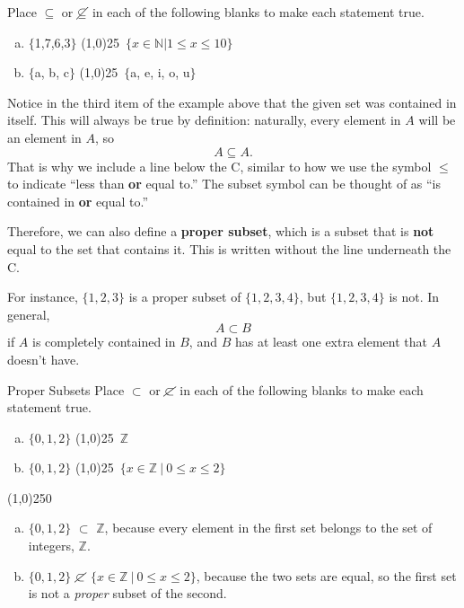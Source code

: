 \begin{try}
Place $\subseteq$ or $\cancel{\subseteq}$ in each of the following blanks to make each statement true.\\

\begin{enumerate}[(a)]
\item $\{$1,7,6,3$\}$ \line(1,0){25}\ $\{x \in \mathbb{N} | 1 \leq x \leq 10\}$\\

\item $\{$a, b, c$\}$ \line(1,0){25}\ $\{$a, e, i, o, u$\}$
\end{enumerate}
\end{try}

Notice in the third item of the example above that the given set was contained in itself.  This will always be true by definition: naturally, every element in $A$ will be an element in $A$, so \[A \subseteq A.\]  That is why we include a line below the C, similar to how we use the symbol $\leq$ to indicate ``less than \textbf{or} equal to.''  The subset symbol can be thought of as ``is contained in \textbf{or} equal to.''

Therefore, we can also define a \textbf{proper subset}, which is a subset that is \textbf{not} equal to the set that contains it.  This is written without the line underneath the C.

For instance, $\{1,2,3\}$ is a proper subset of $\{1,2,3,4\}$, but $\{1,2,3,4\}$ is not.  In general,
\[A \subset B\] if $A$ is completely contained in $B$, and $B$ has at least one extra element that $A$ doesn't have.

\begin{example}[https://www.youtube.com/watch?v=c06crpTh6-8]{Proper Subsets}
Place $\subset$ or $\cancel{\subset}$ in each of the following blanks to make each statement true.\\

\begin{enumerate}[(a)]
\item $\{0,1,2\}$ \line(1,0){25}\ $\mathbb{Z}$\\

\item $\{0,1,2\}$ \line(1,0){25}\ $\{x \in \mathbb{Z} \ | \ 0 \leq x \leq 2\}$
\end{enumerate}

\begin{center}
\line(1,0){250}
\end{center}

\begin{enumerate}[(a)]
\item $\{0,1,2\}$ $\subset$ $\mathbb{Z}$, \sol because every element in the first set belongs to the set of integers, $\mathbb{Z}$.\\

\item $\{0,1,2\}$ $\cancel{\subset}$ $\{x \in \mathbb{Z} \ | \ 0 \leq x \leq 2\}$, because the two sets are equal, so the first set is not a \emph{proper} subset of the second.
\end{enumerate}
\end{example}

